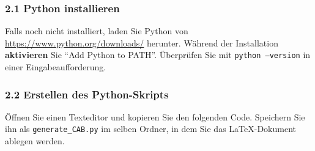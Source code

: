 \documentclass[11pt,a4paper]{article}
\begin{document}
	\subsubsection*{2.1 Python installieren}
	Falls noch nicht installiert, laden Sie Python von \url{https://www.python.org/downloads/} herunter. Während der Installation \textbf{aktivieren} Sie ``Add Python to PATH''. Überprüfen Sie mit \texttt{python --version} in einer Eingabeaufforderung.
	
	\subsubsection*{2.2 Erstellen des Python-Skripts}
	Öffnen Sie einen Texteditor und kopieren Sie den folgenden Code. Speichern Sie ihn als \texttt{generate\_CAB.py} im selben Ordner, in dem Sie das LaTeX-Dokument ablegen werden.
	
\end{document}
